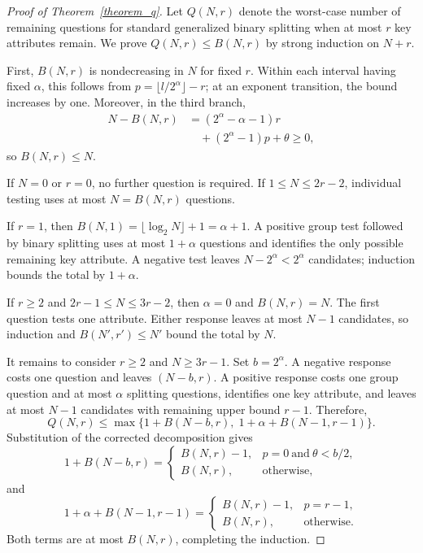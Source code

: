 \documentclass[conference]{IEEEtran}
\theoremstyle{definition}
\theoremstyle{plain}
\begin{document}
\iftoggle{TechnicalReport}
  {\section{Remaining Proofs and Cap Analysis}}
  {\section{Remaining Proofs}}
\label{appen:proof}

\begin{proof}[Proof of Theorem~\ref{theorem_q}]
Let $Q(N,r)$ denote the worst-case number of remaining questions for standard generalized binary splitting when at most $r$ key attributes remain. We prove $Q(N,r)\leq B(N,r)$ by strong induction on $N+r$.

First, $B(N,r)$ is nondecreasing in $N$ for fixed $r$. Within each interval having fixed $\alpha$, this follows from $p=\lfloor l/2^\alpha\rfloor-r$; at an exponent transition, the bound increases by one. Moreover, in the third branch,
\[
\begin{aligned}
N-B(N,r)&=(2^\alpha-\alpha-1)r\\
&\quad +(2^\alpha-1)p+\theta\geq0,
\end{aligned}
\]
so $B(N,r)\leq N$.

If $N=0$ or $r=0$, no further question is required. If $1\leq N\leq2r-2$, individual testing uses at most $N=B(N,r)$ questions.

If $r=1$, then $B(N,1)=\lfloor\log_2N\rfloor+1=\alpha+1$. A positive group test followed by binary splitting uses at most $1+\alpha$ questions and identifies the only possible remaining key attribute. A negative test leaves $N-2^\alpha<2^\alpha$ candidates; induction bounds the total by $1+\alpha$.

If $r\geq2$ and $2r-1\leq N\leq3r-2$, then $\alpha=0$ and $B(N,r)=N$. The first question tests one attribute. Either response leaves at most $N-1$ candidates, so induction and $B(N',r')\leq N'$ bound the total by $N$.

It remains to consider $r\geq2$ and $N\geq3r-1$. Set $b=2^\alpha$. A negative response costs one question and leaves $(N-b,r)$. A positive response costs one group question and at most $\alpha$ splitting questions, identifies one key attribute, and leaves at most $N-1$ candidates with remaining upper bound $r-1$. Therefore,
\[
Q(N,r)\leq\max\{1+B(N-b,r),\;1+\alpha+B(N-1,r-1)\}.
\]
Substitution of the corrected decomposition gives
\[
1+B(N-b,r)=
\begin{cases}
B(N,r)-1,&p=0\ \text{and}\ \theta<b/2,\\
B(N,r),&\text{otherwise},
\end{cases}
\]
and
\[
1+\alpha+B(N-1,r-1)=
\begin{cases}
B(N,r)-1,&p=r-1,\\
B(N,r),&\text{otherwise}.
\end{cases}
\]
Both terms are at most $B(N,r)$, completing the induction.
\end{proof}
\end{document}
